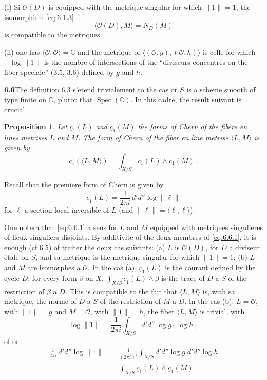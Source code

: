 \documentclass[12pt,a4paper]{article}
\theoremstyle{plain}
\newtheorem{proposition}[theorem]{Proposition}
\theoremstyle{definition}
\theoremstyle{remark}
\DeclareMathOperator{\Spec}{Spec}
\newcommand{\bbC}{\mathbb{C}}
\newcommand{\calO}{\mathcal{O}}
\begin{document}
(i) Si $\calO(D)$ is equipped with the metrique singular for which $\|1\| = 1$, the isomorphism \eqref{eq:6.1.3}
\[
\langle \calO(D), M \rangle = N_D(M)
\]
is compatible to the metriques.

(ii) one has $\langle \calO, \calO \rangle = \bbC$ and the metrique of $\langle (\calO, g), (\calO, h) \rangle$ is celle for which $-\log \|1\|$ is the nombre of intersections of the ``diviseurs concentres on the fiber speciale'' (3.5, 3.6) defined by $g$ and $h$.

\medskip
\noindent\textbf{6.6}\quad The definition 6.3 s'etend trivialement to the cas or $S$ is a scheme smooth of type finite on $\bbC$, plutot that $\Spec(\bbC)$. In this cadre, the result suivant is crucial

\begin{proposition}
Let $\underline{c}_1(L)$ and $\underline{c}_1(M)$ the forms of Chern of the fibers en lines metrises $L$ and $M$. The form of Chern of the fiber en line metrise $\langle L, M \rangle$ is given by
\begin{equation}
\label{eq:6.6.1}
\underline{c}_1(\langle L, M \rangle) = \int_{X/S} c_1(L) \wedge c_1(M) \ .
\end{equation}
\end{proposition}

Recall that the premiere form of Chern is given by
\[
\underline{c}_1(L) = \frac{1}{2\pi i} \, d'd'' \log \|\ell\|
\]
for $\ell$ a section local inversible of $L$ (and $\|\ell\| = \langle \ell, \ell \rangle$).

One notera that \eqref{eq:6.6.1} a sens for $L$ and $M$ equipped with metriques singulieres of lieux singuliers disjoints. By additivite of the deux membres of \eqref{eq:6.6.1}, it is enough (cf 6.5) of traiter the deux cas suivants: (a) $L$ is $\calO(D)$, for $D$ a diviseur étale on $S$, and sa metrique is the metrique singular for which $\|1\| = 1$; (b) $L$ and $M$ are isomorphes a $\calO$. In the cas (a), $\underline{c}_1(L)$ is the courant defined by the cycle $D$: for every form $\beta$ on $X$, $\int_{X/S} \underline{c}_1(L) \wedge \beta$ is the trace of $D$ a $S$ of the restriction of $\beta$ a $D$. This is compatible to the fait that $\langle L, M \rangle$ is, with sa metrique, the norme of $D$ a $S$ of the restriction of $M$ a $D$. In the cas (b): $L = \calO$, with $\|1\| = g$ and $M = \calO$, with $\|1\| = h$, the fiber $\langle L, M \rangle$ is trivial, with
\[
\log \|1\| = \frac{1}{2\pi i} \int_{X/S} d'd'' \log g \cdot \log h \ ,
\]
of or
\begin{align*}
\frac{1}{2\pi i} \, d'd'' \log \|1\| &= \frac{1}{(2\pi i)^2} \int_{X/S} d'd'' \log g \; d'd'' \log h \\
&= \int_{X/S} \underline{c}_1(L) \wedge \underline{c}_1(M) \ .
\end{align*}
\end{document}
